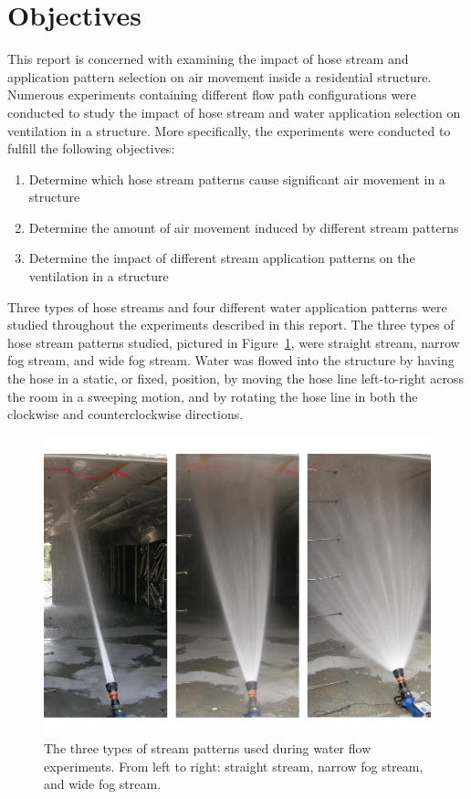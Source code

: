 \documentclass[12pt,oneside]{book}
\begin{document}
\section{Objectives}
\label{sec:objectives}
This report is concerned with examining the impact of hose stream and application pattern selection on air movement inside a residential structure. Numerous experiments containing different flow path configurations were conducted to study the impact of hose stream and water application selection on ventilation in a structure. More specifically, the experiments were conducted to fulfill the following objectives:
\begin{enumerate}
	\item Determine which hose stream patterns cause significant air movement in a structure 
	\item Determine the amount of air movement induced by different stream patterns
	\item Determine the impact of different stream application patterns on the ventilation in a structure
\end{enumerate}

Three types of hose streams and four different water application patterns were studied throughout the experiments described in this report. The three types of hose stream patterns studied, pictured in Figure~\ref{fig:hose_streams}, were straight stream, narrow fog stream, and wide fog stream. Water was flowed into the structure by having the hose in a static, or fixed, position, by moving the hose line left-to-right across the room in a sweeping motion, and by rotating the hose line in both the clockwise and counterclockwise directions.

\begin{figure}[!ht]
	\includegraphics[width=\columnwidth]{../Figures/Pictures/hose_streams.pdf}
	\caption[Hose stream patterns used in experiments.]{The three types of stream patterns used during water flow experiments. From left to right: straight stream, narrow fog stream, and wide fog stream.}
	\label{fig:hose_streams}
\end{figure}
\end{document}
